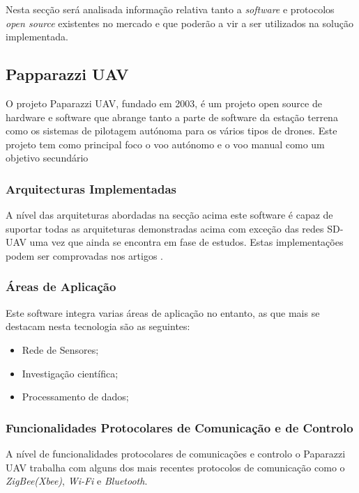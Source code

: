 Nesta secção será analisada informação relativa tanto a \textit{software} e protocolos \textit{open source} existentes no mercado e que poderão a vir a ser utilizados na solução implementada.

\subsection{Papparazzi UAV}

O projeto Paparazzi UAV, fundado em 2003, é um projeto open source de hardware e software que abrange tanto a parte de software da estação terrena como os sistemas de pilotagem autónoma para os vários tipos de drones. Este projeto tem como principal foco o voo autónomo e o voo manual como um objetivo secundário \cite{TheFr2003}

\subsubsection{Arquitecturas Implementadas}

A nível das arquiteturas abordadas na secção acima este software é capaz de suportar todas as arquiteturas demonstradas acima com exceção das redes SD-UAV uma vez que ainda se encontra em fase de estudos. Estas implementações podem ser comprovadas nos artigos \cite{Remes2013,Bouachir2014a}.

\pagebreak
\subsubsection{Áreas de Aplicação}
Este software integra varias áreas de aplicação no entanto, as que mais se destacam nesta tecnologia são as seguintes:

\begin{itemize}
    \item Rede de Sensores;
    \item Investigação científica;
    \item Processamento de dados;
\end{itemize}

\subsubsection{Funcionalidades Protocolares de Comunicação e de Controlo}

A nível de funcionalidades protocolares de comunicações e controlo o Paparazzi UAV trabalha com alguns dos mais recentes protocolos de comunicação como o \textit{ZigBee(Xbee)}, \textit{Wi-Fi} e \textit{Bluetooth}\cite{TheFr2003}.

